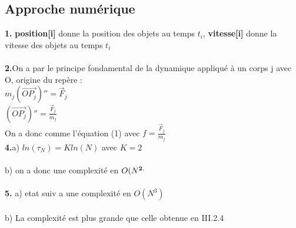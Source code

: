 \documentclass{article}
\begin{document}
\subsection{Approche numérique}
{\bf 1.} {\bf position[i]} donne la position des objets au temps $t_i$, {\bf vitesse[i]} donne la vitesse des objets au temps $t_i$ \\
\\
{\bf 2.}On a par le principe fondamental de la dynamique appliqué à un corps j avec O, origine du repère : \\
$ m_j (\overrightarrow{OP_j})'' = \vec F_j $ \\
$(\overrightarrow{OP_j})'' =\frac{ \vec F_j}{m_j} $ \\
On a donc comme l'équation (1) avec $f=\frac{ \vec F_j}{m_j}$ \\


{\bf 4.}a) $ln(\tau_N)=Kln(N)$ avec $K=2$ \\
\\
b) on a donc une complexité en $O(N^{\bf 2.}$ \\
\\
{\bf 5.} a) etat suiv a une complexité en $O(N^3)$ \\
\\
b) La complexité est plus grande que celle obtenue en III.2.4 \\

\end{document}
